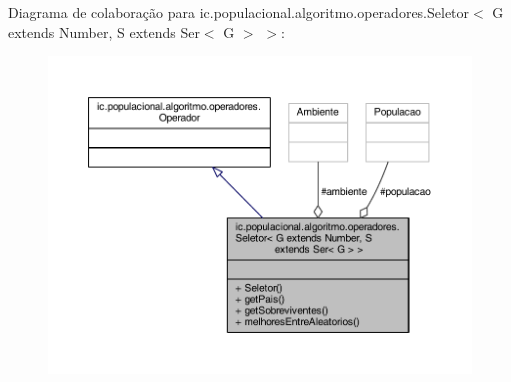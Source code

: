 Diagrama de colaboração para ic.\-populacional.\-algoritmo.\-operadores.\-Seletor$<$ G extends Number, S extends Ser$<$ G $>$ $>$\-:\nopagebreak
\begin{figure}[H]
\begin{center}
\leavevmode
\includegraphics[width=350pt]{classic_1_1populacional_1_1algoritmo_1_1operadores_1_1_seletor_3_01_g_01extends_01_number_00_01_44f145cb717d4f73531ecefbe0b4ee3d}
\end{center}
\end{figure}
